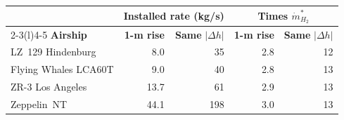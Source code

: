 \begin{tabular}{@{} l r r r r @{}}
\toprule
 & \multicolumn{2}{c}{\textbf{Installed rate (kg/s)}} & \multicolumn{2}{c}{\textbf{Times }\boldmath$\dot m^*_{H_2}$} \\
\cmidrule(lr){2-3}\cmidrule(l){4-5}
\textbf{Airship} & \textbf{1-m rise} & \textbf{Same }\boldmath$|\Delta h|$ & \textbf{1-m rise} & \textbf{Same }\boldmath$|\Delta h|$ \\
\midrule
LZ~129 Hindenburg & 8.0 & 35 & 2.8 & 12 \\
Flying Whales LCA60T & 9.0 & 40 & 2.8 & 13 \\
ZR-3 Los Angeles & 13.7 & 61 & 2.9 & 13 \\
Zeppelin~NT & 44.1 & 198 & 3.0 & 13 \\
\bottomrule
\end{tabular}
